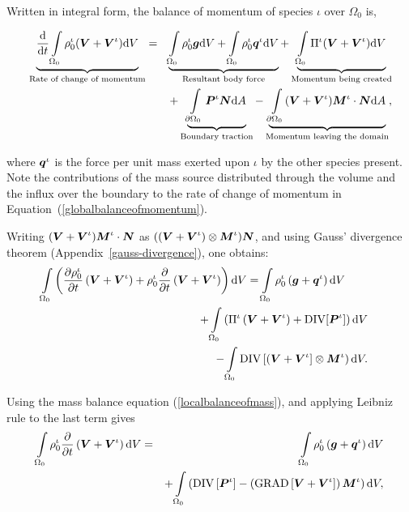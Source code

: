 Written in integral form, the balance of momentum of species $\iota$
over $\Omega_0$ is, 

\begin{eqnarray}
\underbrace{\frac{\mathrm{d}}{\mathrm{d}t} \int\limits_{\Omega_0}
\rho_0^\iota(\mbox{\boldmath$ V$}+\mbox{\boldmath$ V$}^\iota) \mathrm{d}V}_{\text{Rate of change of
    momentum}} &=& \underbrace{\int\limits_{\Omega_0} 
\rho^\iota_0\mbox{\boldmath$ g$} \mathrm{d}V + \int\limits_{\Omega_0}
\rho^\iota_0\mbox{\boldmath$ q$}^\iota \mathrm{d}V}_{\text{Resultant body force}} +
\underbrace{\int\limits_{\Omega_0} 
\Pi^\iota(\mbox{\boldmath$ V$}+\mbox{\boldmath$ V$}^\iota) \mathrm{d}V}_{\text{Momentum
    being created}} \nonumber\\
& &+ \underbrace{\int\limits_{\partial \Omega_0}\mbox{\boldmath$ P$}^\iota\mbox{\boldmath$ N$}
  \mathrm{d}A}_{\text{Boundary traction}} - 
\underbrace{\int\limits_{\partial \Omega_0}(\mbox{\boldmath$ V$}+\mbox{\boldmath$ V$}^\iota)\mbox{\boldmath$ M$}^\iota\cdot\mbox{\boldmath$ N$}
\mathrm{d}A}_{\text{Momentum leaving the domain}},
\label{globalbalanceofmomentum}
\end{eqnarray}

\noindent where $\mbox{\boldmath$ q$}^\iota$ is the force per unit mass exerted upon
$\iota$ by the other species present. Note the contributions of the
mass source distributed through the volume and the influx over the
boundary to the rate of change of momentum in
Equation~(\ref{globalbalanceofmomentum}).

Writing $(\mbox{\boldmath$ V$}+\mbox{\boldmath$ V$}^\iota) \mbox{\boldmath$ M$}^\iota\cdot\mbox{\boldmath$ N$}$ as
$((\mbox{\boldmath$ V$}+\mbox{\boldmath$ V$}^\iota)\otimes\mbox{\boldmath$ M$}^\iota)\mbox{\boldmath$ N$}$, and using Gauss' divergence 
theorem (Appendix~\ref{gauss-divergence}), one obtains:
\begin{eqnarray}
\int\limits_{\Omega_0} \left(\frac{\partial\rho_0^\iota}{\partial
t}\left(\mbox{\boldmath$ V$}+\mbox{\boldmath$ V$}^\iota\right) +
\rho_0^\iota\frac{\partial}{\partial
t}\left(\mbox{\boldmath$ V$}+\mbox{\boldmath$ V$}^\iota\right)\right) \mathrm{d}V =
\int\limits_{\Omega_0}\rho^\iota_0\left(\mbox{\boldmath$ g$}+\mbox{\boldmath$ q$}^\iota\right)
\mathrm{d}V \qquad& &\nonumber\\
+\int\limits_{\Omega_0}\left(\Pi^\iota\left(\mbox{\boldmath$ V$}+\mbox{\boldmath$ V$}^\iota\right) +
\mathrm{DIV}[\mbox{\boldmath$ P$}^\iota]\right)
\mathrm{d}V& & \nonumber\\
-
\int\limits_{\Omega_0}\mathrm{DIV}
\left[\left(\mbox{\boldmath$ V$}+\mbox{\boldmath$ V$}^\iota\right]\otimes\mbox{\boldmath$ M$}^\iota\right)\mathrm{d}V .
& &
\end{eqnarray}

\noindent Using the mass balance equation (\ref{localbalanceofmass}),
and applying Leibniz rule to the last term gives
\begin{eqnarray}
\int\limits_{\Omega_0} \rho_0^\iota\frac{\partial}{\partial
t}\left(\mbox{\boldmath$ V$}+\mbox{\boldmath$ V$}^\iota\right) \mathrm{d}V &=&
\int\limits_{\Omega_0}\rho^\iota_0\left(\mbox{\boldmath$ g$}+\mbox{\boldmath$ q$}^\iota\right)
\mathrm{d}V \nonumber\\
& &+
\int\limits_{\Omega_0}\left(\mathrm{DIV}\left[\mbox{\boldmath$ P$}^\iota\right] -
\left(\mathrm{GRAD}\left[\mbox{\boldmath$ V$}+\mbox{\boldmath$ V$}^\iota\right]\right)\mbox{\boldmath$ M$}^\iota\right)
\mathrm{d}V,
\end{eqnarray}

